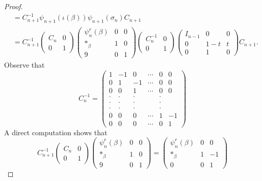 \begin{proof}
\begin{align*}
                                         &= C_{n+1}^{-1}\psi_{n+1}(\iota(\beta)) \psi_{n+1}(\sigma_n) C_{n+1} \\
  &= C_{n+1}^{-1} \begin{pmatrix} C_n & 0 \\ 0 & 1 \end{pmatrix} \begin{pmatrix} \psi_n^r(\beta) & 0 & 0 \\ *_{\beta} & 1 & 0 \\ 9 & 0 & 1 \end{pmatrix} \begin{pmatrix} C_n^{-1} & 0 \\ 0 & 1 \end{pmatrix} \begin{pmatrix} I_{n-1} & 0 & 0 \\ 0 & 1-t & t \\ 0 & 1 & 0 \end{pmatrix} C_{n+1}.
\end{align*}
Observe that 
\begin{displaymath}
  C_n^{-1} = \begin{pmatrix} 1 & -1 & 0 & \cdots & 0 & 0 \\
    0 & 1 & -1 & \cdots & 0 & 0 \\
    0 & 0 & 1 & \cdots & 0 & 0 \\
    \cdot & \cdot & \cdot & & \cdot & \\
    \cdot & \cdot & \cdot & & \cdot & \\
    \cdot & \cdot & \cdot & & \cdot & \\
    0 & 0 & 0 & \cdots & 1 & -1 \\
    0 & 0 & 0 & \cdots & 0 & 1
  \end{pmatrix}
\end{displaymath}
A direct computation shows that 
\begin{displaymath}
C_{n+1}^{-1} \begin{pmatrix} C_n & 0 \\ 0 & 1 \end{pmatrix} \begin{pmatrix} \psi_n^r(\beta) & 0 & 0 \\ *_{\beta} & 1 & 0 \\ 9 & 0 & 1 \end{pmatrix} = \begin{pmatrix} \psi_n^r(\beta) & 0 & 0 \\ *_{\beta} & 1 & -1 \\ 0 & 0 & 1 \end{pmatrix}

\end{displaymath}
\end{proof}
